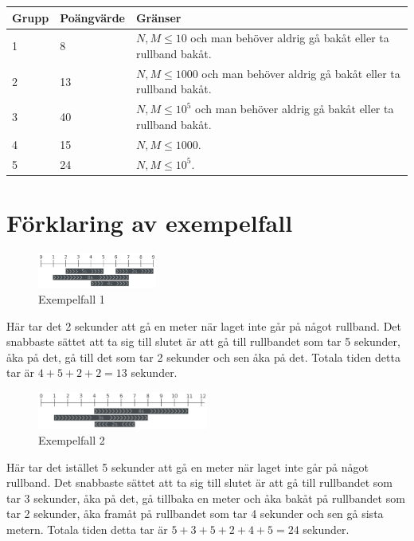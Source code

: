 \noindent
\begin{tabular}{| l | l | l |}
\hline
Grupp & Poängvärde & Gränser \\ \hline
1     & 8          &  $N,M \le 10$ och man behöver aldrig gå bakåt eller ta rullband bakåt.\\ \hline
2     & 13         &  $N,M \le 1000$ och man behöver aldrig gå bakåt eller ta rullband bakåt.\\ \hline
3     & 40         &  $N,M \le 10^5$ och man behöver aldrig gå bakåt eller ta rullband bakåt.\\ \hline
4     & 15         &  $N,M \le 1000$. \\ \hline
5     & 24         &  $N,M \le 10^5$. \\ \hline
\end{tabular}

\section*{Förklaring av exempelfall}

\begin{figure}[h]
	\centering
\includegraphics[width=0.35\textwidth]{sample1}
\caption{Exempelfall 1}
\end{figure}
Här tar det 2 sekunder att gå en meter när laget inte går på något rullband.
Det snabbaste sättet att ta sig till slutet är att gå till rullbandet som
tar 5 sekunder, åka på det, gå till det som tar 2 sekunder och sen åka på det.
Totala tiden detta tar är $4+5+2+2=13$ sekunder.



\begin{figure}[h]
	\centering
\includegraphics[width=0.5\textwidth]{sample2}
\caption{Exempelfall 2}
\end{figure}
Här tar det istället 5 sekunder att gå en meter när laget inte går på något rullband.
Det snabbaste sättet att ta sig till slutet är att gå till rullbandet som
tar 3 sekunder, åka på det, gå tillbaka en meter och åka bakåt på
rullbandet som tar 2 sekunder, åka framåt på rullbandet som tar 4 sekunder
och sen gå sista metern.
Totala tiden detta tar är $5+3+5+2+4+5=24$ sekunder.
